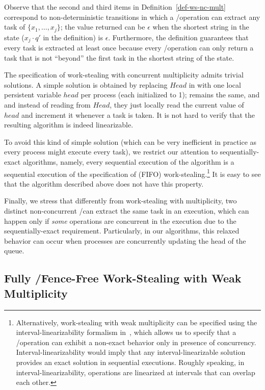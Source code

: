 Observe that the second and third items in Definition~\ref{def-ws-nc-mult} correspond to non-deterministic transitions in which a \Take/\Steal operation can extract any task of \(\{x_1, \hdots, x_j\}\); the value returned can be \(\epsilon\) when the shortest string in the state (\(x_j \cdot q'\) in the definition) is \(\epsilon\).  Furthermore, the definition guarantees that every task is extracted at least once because every \Take/\Steal operation can only return a task that is not ``beyond'' the first task in the shortest string of the state.

The specification of work-stealing with concurrent multiplicity admits trivial solutions.  A simple solution is obtained by replacing \(Head\) in \WFWSM with one local persistent variable \(head\) per process (each initialized to 1); \Put remains the same, and \Take and \Steal instead of reading from \(Head\), they just locally read the current value of \(head\) and increment it whenever a task is taken. It is not hard to verify that the resulting algorithm is indeed linearizable.

To avoid this kind of simple solution (which can be very inefficient in practice as every process might execute every task), we restrict our attention to sequentially-exact algorithms, namely, every sequential execution of the algorithm is a sequential execution of the specification of (FIFO) work-stealing.\footnote{Alternatively, work-stealing with weak multiplicity can be specified using the interval-linearizability formalism in~\cite{DBLP_journals_jacm_CastanedaRR18}, which allows us to specify that a \Take/\Steal operation can exhibit a non-exact behavior only in presence of concurrency. Interval-linearizability would imply that any interval-linearizable solution provides an exact solution in sequential executions.  Roughly speaking, in interval-linearizability, operations are linearized at intervals that can overlap each other.}  It is easy to see that the algorithm described above does not have this property.

Finally, we stress that differently from work-stealing with multiplicity, two distinct non-concurrent \Take/\Steal can extract the same task in an execution, which can happen only if \emph{some} operations are concurrent in the execution due to the sequentially-exact requirement.  Particularly, in our algorithms, this relaxed behavior can occur when processes are concurrently updating the head of the queue.


\subsection{\label{sec-ws-mult-read-write} Fully \R/\W Fence-Free  Work-Stealing with Weak Multiplicity}

